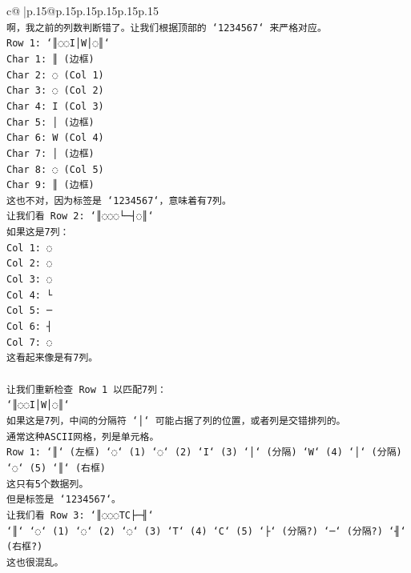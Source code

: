 \documentclass{article}
\begin{document}
{\begin{supertabular}{c@{$\;$}|p{.15\linewidth}@{}p{.15\linewidth}p{.15\linewidth}p{.15\linewidth}p{.15\linewidth}p{.15\linewidth}}
{{{\\ 
\texttt{啊，我之前的列数判断错了。让我们根据顶部的 `1234567` 来严格对应。} \\
\texttt{Row 1: `║◌◌I│W│◌║`} \\
\texttt{Char 1: ║ (边框)} \\
\texttt{Char 2: ◌ (Col 1)} \\
\texttt{Char 3: ◌ (Col 2)} \\
\texttt{Char 4: I (Col 3)} \\
\texttt{Char 5: │ (边框)} \\
\texttt{Char 6: W (Col 4)} \\
\texttt{Char 7: │ (边框)} \\
\texttt{Char 8: ◌ (Col 5)} \\
\texttt{Char 9: ║ (边框)} \\
\texttt{这也不对，因为标签是 `1234567`，意味着有7列。} \\
\texttt{让我们看 Row 2: `║◌◌◌└─┤◌║`} \\
\texttt{如果这是7列：} \\
\texttt{Col 1: ◌} \\
\texttt{Col 2: ◌} \\
\texttt{Col 3: ◌} \\
\texttt{Col 4: └} \\
\texttt{Col 5: ─} \\
\texttt{Col 6: ┤} \\
\texttt{Col 7: ◌} \\
\texttt{这看起来像是有7列。} \\
\\ 
\texttt{让我们重新检查 Row 1 以匹配7列：} \\
\texttt{`║◌◌I│W│◌║`} \\
\texttt{如果这是7列，中间的分隔符 `│` 可能占据了列的位置，或者列是交错排列的。} \\
\texttt{通常这种ASCII网格，列是单元格。} \\
\texttt{Row 1: `║` (左框) `◌` (1) `◌` (2) `I` (3) `│` (分隔) `W` (4) `│` (分隔) `◌` (5) `║` (右框)} \\
\texttt{这只有5个数据列。} \\
\texttt{但是标签是 `1234567`。} \\
\texttt{让我们看 Row 3: `║◌◌◌TC├─╢`} \\
\texttt{`║` `◌` (1) `◌` (2) `◌` (3) `T` (4) `C` (5) `├` (分隔?) `─` (分隔?) `╢` (右框?)} \\
\texttt{这也很混乱。} \\
\\ 
}}}
\end{supertabular}}
\end{document}
